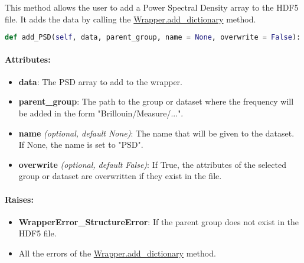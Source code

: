 This method allows the user to add a Power Spectral Density array to the HDF5 file. It adds the data by calling the \hyperref[subchapter:wrapper.add_dictionary]{Wrapper.add\_dictionary} method.

\begin{lstlisting}[language=Python]
def add_PSD(self, data, parent_group, name = None, overwrite = False):
\end{lstlisting}

\paragraph{Attributes:}

\begin{itemize}
    \item \textbf{data}: The PSD array to add to the wrapper. 
    \item \textbf{parent\_group}: The path to the group or dataset where the frequency will be added in the form "Brillouin/Measure/...".
    \item \textbf{name} \textit{(optional, default None)}: The name that will be given to the dataset. If None, the name is set to "PSD".
    \item \textbf{overwrite} \textit{(optional, default False)}: If True, the attributes of the selected group or dataset are overwritten if they exist in the file.
\end{itemize}

\paragraph{Raises:}
\begin{itemize}
    \item \textbf{WrapperError\_StructureError}: If the parent group does not exist in the HDF5 file.
    \item All the errors of the \hyperref[subchapter:wrapper.add_dictionary]{Wrapper.add\_dictionary} method.
\end{itemize}
